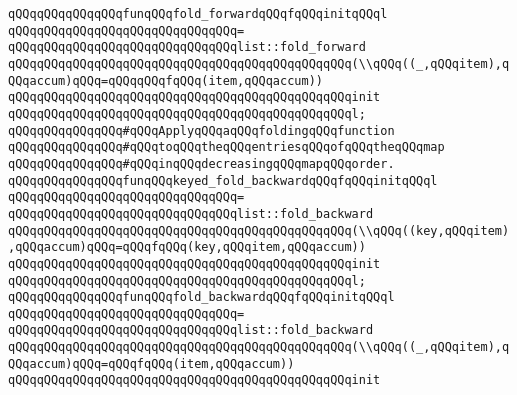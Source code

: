 \verb|qQQqqQQqqQQqqQQqfunqQQqfold_forwardqQQqfqQQqinitqQQql|\newline
\verb|qQQqqQQqqQQqqQQqqQQqqQQqqQQqqQQq=|\newline
\verb|qQQqqQQqqQQqqQQqqQQqqQQqqQQqqQQqlist::fold_forward|\newline
\verb|qQQqqQQqqQQqqQQqqQQqqQQqqQQqqQQqqQQqqQQqqQQqqQQq(\\qQQq((_,qQQqitem),qQQqaccum)qQQq=qQQqqQQqfqQQq(item,qQQqaccum))|\newline
\verb|qQQqqQQqqQQqqQQqqQQqqQQqqQQqqQQqqQQqqQQqqQQqqQQqinit|\newline
\verb|qQQqqQQqqQQqqQQqqQQqqQQqqQQqqQQqqQQqqQQqqQQqqQQql;|\newline
\newline
\newline
\verb|qQQqqQQqqQQqqQQq#qQQqApplyqQQqaqQQqfoldingqQQqfunction|\newline
\verb|qQQqqQQqqQQqqQQq#qQQqtoqQQqtheqQQqentriesqQQqofqQQqtheqQQqmap|\newline
\verb|qQQqqQQqqQQqqQQq#qQQqinqQQqdecreasingqQQqmapqQQqorder.|\newline
\newline
\verb|qQQqqQQqqQQqqQQqfunqQQqkeyed_fold_backwardqQQqfqQQqinitqQQql|\newline
\verb|qQQqqQQqqQQqqQQqqQQqqQQqqQQqqQQq=|\newline
\verb|qQQqqQQqqQQqqQQqqQQqqQQqqQQqqQQqlist::fold_backward|\newline
\verb|qQQqqQQqqQQqqQQqqQQqqQQqqQQqqQQqqQQqqQQqqQQqqQQq(\\qQQq((key,qQQqitem),qQQqaccum)qQQq=qQQqfqQQq(key,qQQqitem,qQQqaccum))|\newline
\verb|qQQqqQQqqQQqqQQqqQQqqQQqqQQqqQQqqQQqqQQqqQQqqQQqinit|\newline
\verb|qQQqqQQqqQQqqQQqqQQqqQQqqQQqqQQqqQQqqQQqqQQqqQQql;|\newline
\newline
\verb|qQQqqQQqqQQqqQQqfunqQQqfold_backwardqQQqfqQQqinitqQQql|\newline
\verb|qQQqqQQqqQQqqQQqqQQqqQQqqQQqqQQq=|\newline
\verb|qQQqqQQqqQQqqQQqqQQqqQQqqQQqqQQqlist::fold_backward|\newline
\verb|qQQqqQQqqQQqqQQqqQQqqQQqqQQqqQQqqQQqqQQqqQQqqQQq(\\qQQq((_,qQQqitem),qQQqaccum)qQQq=qQQqfqQQq(item,qQQqaccum))|\newline
\verb|qQQqqQQqqQQqqQQqqQQqqQQqqQQqqQQqqQQqqQQqqQQqqQQqinit|\newline
